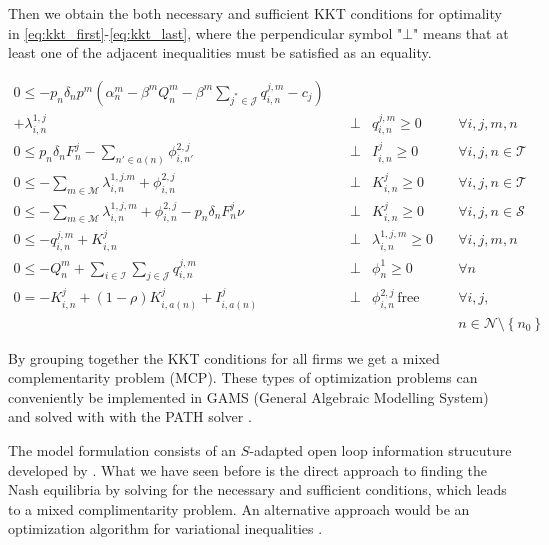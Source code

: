 Then we obtain the both necessary and sufficient KKT conditions for optimality in \eqref{eq:kkt_first}-\eqref{eq:kkt_last}, where the perpendicular symbol "$\bot$" means that at least one of the adjacent inequalities must be satisfied as an equality.


\begin{align}
0\leq - p_n\delta_np^m\left(\alpha_n^m-\beta^m Q_n^m-\beta^m\sum_{j^*\in \mathcal{J}}q_{i,n}^{j,m}-c_j\right) \nonumber\\
+\lambda_{i,n}^{1,j} &\quad\bot&q_{i,n}^{j,m}\geq 0&  \quad \forall i,j,m,n\label{eq:kkt_first}\\
0\leq p_n\delta_nF_n^{j} - \sum_{n'\in a(n)}\phi_{i,n'}^{2,j} &\quad\bot&I_{i,n}^{j}\geq 0&  \quad \forall i,j,n\in\mathcal{T}\\
0 \leq -\sum_{m\in\mathcal{M}}\lambda_{i,n}^{1,j.m}  +\phi_{i,n}^{2,j} &\quad\bot&K_{i,n}^{j}\geq 0&  \quad \forall i,j,n\in\mathcal{T}\\
0 \leq -\sum_{m\in\mathcal{M}}\lambda_{i,n}^{1,j,m}  +\phi_{i,n}^{2,j}-p_n\delta_nF_n^j\nu &\quad\bot&K_{i,n}^{j}\geq 0&  \quad \forall i,j,n\in\mathcal{S}\\
0\leq -q_{i,n}^{j,m} + K_{i,n}^{j} &\quad\bot&\lambda_{i,n}^{1,j,m}\geq 0&  \quad \forall i,j,m,n\\
0 \leq -Q_n^m+\sum_{i\in \mathcal{I}}\sum_{j\in \mathcal{J}} q_{i,n}^{j,m} &\quad\bot&\phi_{n}^{1}\geq 0&  \quad \forall n\\
0 = -K_{i,n}^{j} + (1-\rho)K_{i,a(n)}^{j}+I_{i,a(n)}^{j} &\quad\bot& \phi_{i,n}^{2,j}\,\mbox{free} & \quad \forall i,j,\nonumber\\
&&& \quad n\in\mathcal{N}\setminus \left\{n_0\right\}\label{eq:kkt_last}
\end{align}

By grouping together the KKT conditions for all firms we get a mixed complementarity problem (MCP). These types of optimization problems can conveniently be implemented in GAMS (General Algebraic Modelling System) and solved with with the PATH solver \citep[see][]{Ferris2000}.

The model formulation consists of an $S$-adapted open loop information strucuture developed by \cite{Haurie1990}. What we have seen before is the direct approach to finding the Nash equilibria by solving for the necessary and sufficient conditions, which leads to a mixed complimentarity problem. An alternative approach would be an optimization algorithm for variational inequalities \citep[see e.g.][]{Haurie2002, Pineau2003}.

